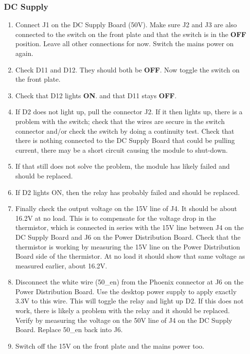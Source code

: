 \subsubsection{DC Supply}

\begin{enumerate}
	\item Connect J1 on the DC Supply Board (50V). Make sure J2 and J3 are also connected to the switch on the front plate and that the switch is in the \textbf{OFF} position. Leave all other connections for now. Switch the mains power on again.
	\item Check D11 and D12. They should both be \textbf{OFF}. Now toggle the switch on the front plate.
	\item Check that D12 lights \textbf{ON}. and that D11 stays \textbf{OFF}.
	\item If D2 does not light up, pull the connector J2. If it then lights up, there is a problem with the switch; check that the wires are secure in the switch connector and/or check the switch by doing a continuity test. Check that there is nothing connected to the DC Supply Board that could be pulling current, there may be a short circuit causing the module to shut-down.
	\item If that still does not solve the problem, the module has likely failed and should be replaced.
	\item If D2 lights ON, then the relay has probably failed and should be replaced.
	\item Finally check the output voltage on the 15V line of J4. It should be about 16.2V at no load. This is to compensate for the voltage drop in the thermistor, which is connected in series with the 15V line between J4 on the DC Supply Board and J6 on the Power Distribution Board. Check that the thermistor is working by measuring the 15V line on the Power Distribution Board side of the thermistor. At no load it should show that same voltage as measured earlier, about 16.2V.
	\item Disconnect the white wire (50\_en) from the Phoenix connector at J6 on the Power Distribution Board. Use the desktop power supply to apply exactly 3.3V to this wire. This will toggle the relay and light up D2. If this does not work, there is likely a problem with the relay and it should be replaced. Verify by measuring the voltage on the 50V line of J4 on the DC Supply Board. Replace 50\_en back into J6.
	\item Switch off the 15V on the front plate and the mains power too.
\end{enumerate}

